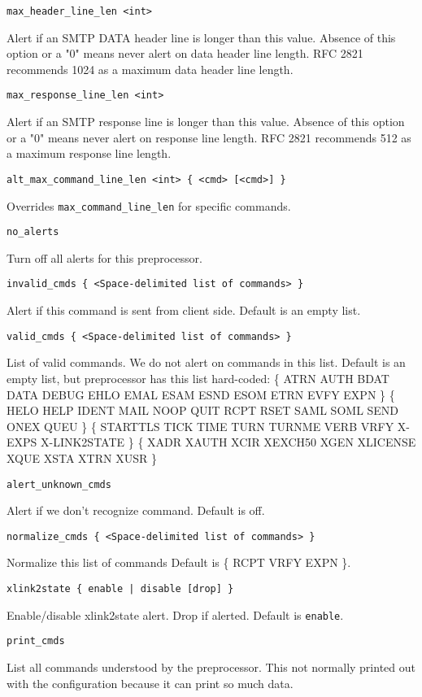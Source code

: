 \documentclass[english]{report}
\newcounter{slistnum}
\newenvironment{slist}
{ \begin{list}{ {\bf \arabic{slistnum}.} }{\usecounter{slistnum} } }
{ \end{list} }
\begin{document}
\begin{slist}
\item \texttt{max\_header\_line\_len <int>}

Alert if an SMTP DATA header line is longer than this value.  Absence of this
option or a "0" means never alert on data header line length.
RFC 2821 recommends 1024 as a maximum data header line length.

\item \texttt{max\_response\_line\_len <int>}

Alert if an SMTP response line is longer than this value.  Absence of this
option or a "0" means never alert on response line length.
RFC 2821 recommends 512 as a maximum response line length.

\item \texttt{alt\_max\_command\_line\_len <int> \{ <cmd> [<cmd>] \}}

Overrides \texttt{max\_command\_line\_len} for specific commands.

\item \texttt{no\_alerts}

Turn off all alerts for this preprocessor.

\item \texttt{invalid\_cmds \{ <Space-delimited list of commands> \}}

Alert if this command is sent from client side.
Default is an empty list.

\item \texttt{valid\_cmds \{ <Space-delimited list of commands> \}}

List of valid commands.  We do not alert on commands in this list.
Default is an empty list, but preprocessor has this list hard-coded:
\{ ATRN AUTH BDAT DATA DEBUG EHLO EMAL ESAM ESND ESOM ETRN EVFY EXPN \}
\{ HELO HELP IDENT MAIL NOOP QUIT RCPT RSET SAML SOML SEND ONEX QUEU \}
\{ STARTTLS TICK TIME TURN TURNME VERB VRFY X-EXPS X-LINK2STATE \}
\{ XADR XAUTH XCIR XEXCH50 XGEN XLICENSE XQUE XSTA XTRN XUSR  \}

\item \texttt{alert\_unknown\_cmds}

Alert if we don't recognize command.  Default is off.

\item \texttt{normalize\_cmds \{ <Space-delimited list of commands> \}}

Normalize this list of commands Default is \{ RCPT VRFY EXPN \}.

\item \texttt{xlink2state \{ enable | disable [drop] \}}

Enable/disable xlink2state alert.  Drop if alerted.  Default is \texttt{enable}.

\item \texttt{print\_cmds}

List all commands understood by the preprocessor.  This not normally
printed out with the configuration because it can print so much data.

\end{slist}
\end{document}
